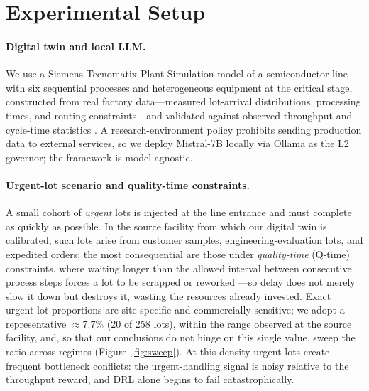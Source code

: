 \documentclass[letterpaper]{article} %
\begin{document}
\section{Experimental Setup}
\label{sec:setup}

\paragraph{Digital twin and local LLM.}
We use a Siemens Tecnomatix Plant Simulation model of a semiconductor line with
six sequential processes and heterogeneous equipment at the critical stage,
constructed from real factory data---measured lot-arrival distributions,
processing times, and routing constraints---and validated against observed
throughput and cycle-time statistics \citep{siemens2023tecnomatix}. A
research-environment policy prohibits sending production data to external
services, so we deploy Mistral-7B \citep{jiang2023} locally via Ollama as the L2
governor; the framework is model-agnostic.

\paragraph{Urgent-lot scenario and quality-time constraints.}
A small cohort of \emph{urgent} lots is injected at the line entrance and must
complete as quickly as possible. In the source facility from which our digital
twin is calibrated, such lots arise from customer samples, engineering-evaluation
lots, and expedited orders; the most consequential are those under
\emph{quality-time} (Q-time) constraints, where waiting longer than the allowed
interval between consecutive process steps forces a lot to be scrapped or
reworked \citep{kim2018qtime}---so delay does not merely slow it down but
destroys it, wasting the resources already invested. Exact urgent-lot proportions
are site-specific and commercially sensitive; we adopt a representative
$\approx$7.7\% (20 of 258 lots), within the range observed at the source
facility, and, so that our conclusions do not hinge on this single value, sweep
the ratio across regimes (Figure~\ref{fig:sweep}). At this density urgent lots create frequent bottleneck
conflicts: the urgent-handling signal is noisy relative to the throughput reward,
and DRL alone begins to fail catastrophically.
\end{document}
